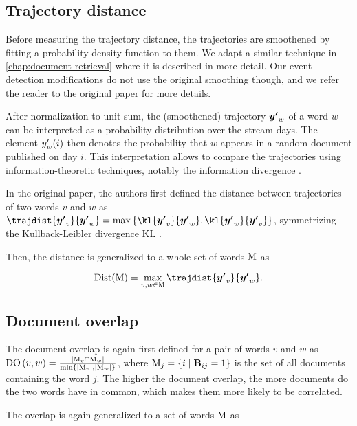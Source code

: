 \subsection{Trajectory distance}
Before measuring the trajectory distance, the trajectories are smoothened by fitting a probability density function to them. We adapt a similar technique in \autoref{chap:document-retrieval} where it is described in more detail. Our event detection modifications do not use the original smoothing though, and we refer the reader to the original paper for more details.

After normalization to unit sum, the (smoothened) trajectory $\vect{\trajn}_{w}$ of a word $w$ can be interpreted as a probability distribution over the stream days. The element $y'_{w}(i)$ then denotes the probability that $w$ appears in a random document published on day $i$. This interpretation allows to compare the trajectories using information-theoretic techniques, notably the information divergence \citep{information-theory}.

In the original paper, the authors first defined the distance between trajectories of two words $v$ and $w$ as $\trajdist{\vect{\trajn}_{v}}{\vect{\trajn}_{w}} = \max \left\{ \kl{\vect{\trajn}_{v}}{\vect{\trajn}_{w}}, \kl{\vect{\trajn}_{w}}{\vect{\trajn}_{v}} \right\}$, symmetrizing the Kullback-Leibler divergence KL \citep{kl-divergence}.

Then, the distance is generalized to a whole set of words $\text{M}$ as

\begin{equation} \label{eq:trajectory-distance}
	\text{Dist}( \featset ) = \max_{v, w \in \featset} \trajdist{\vect{\trajn}_{v}}{\vect{\trajn}_{w}}.
\end{equation}

\subsection{Document overlap}
The document overlap is again first defined for a pair of words $v$ and $w$ as $\text{DO}\left( v, w \right) = \frac{| \text{M}_{v} \cap \text{M}_{w} |}{\min \left\{ | \text{M}_{v} |, | \text{M}_{w} | \right\}}$, where $\text{M}_{j} = \{ i \mid \mathbf{B}_{ij} = 1 \}$ is the set of all documents containing the word $j$. The higher the document overlap, the more documents do the two words have in common, which makes them more likely to be correlated.

The overlap is again generalized to a set of words $\text{M}$ as

